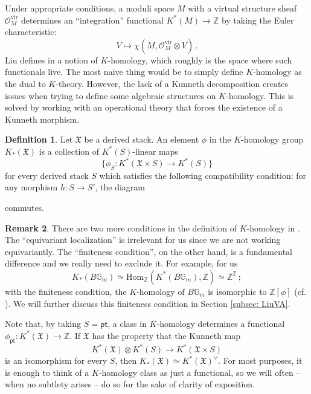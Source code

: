 \documentclass[12pt]{amsart}
\theoremstyle{definition}
\newtheorem{definition}{Definition}[section]
\newtheorem{remark}[definition]{Remark}
\newcommand{\BG}{{\mathbb{G}}}
\newcommand{\BZ}{{\mathbb{Z}}}
\newcommand{\CO}{{\mathcal O}}
\newcommand{\1}{\mathbf 1}
\newcommand{\FX}{{\mathfrak{X}}}
\DeclareMathOperator{\id}{id}
\newcommand{\pt}{{\mathsf{pt}}}
\newcommand{\Hom}{\mathrm{Hom}}
\newcommand{\vir}{\mathrm{vir}}
\begin{document}
Under appropriate conditions, a moduli space $M$ with a virtual structure sheaf $\CO_M^\vir$ determines an ``integration'' functional $K^\ast(M)\to \BZ$ by taking the Euler characteristic:
\[V\mapsto \chi(M, \CO^\vir_M\otimes V)\,.\]
Liu defines in \cite{Liu} a notion of $K$-homology, which roughly is the space where such functionals live. The most naive thing would be to simply define $K$-homology as the dual to $K$-theory. However, the lack of a Kunneth decomposition creates issues when trying to define some algebraic structures on $K$-homology. This is solved by working with an operational theory that forces the existence of a Kunneth morphism.

\begin{definition}\label{def: K-hom}
Let $\FX$ be a derived stack. An element $\phi$ in the $K$-homology group $K_\ast(\FX)$ is a collection of $K^\ast(S)$-linear maps
\[\{\phi_S\colon K^\ast(\FX\times S)\to K^\ast(S)\}\]
for every derived stack $S$ which satisfies the following compatibility condition: for any morphism $h\colon S\to S'$, the diagram 
\begin{center}
\end{center}
commutes.
\end{definition}

\begin{remark}
    There are two more conditions in the definition of $K$-homology in \cite{Liu}. The ``equivariant localization'' is irrelevant for us since we are not working equivariantly. The  ``finiteness condition'', on the other hand, is a fundamental difference and we really need to exclude it. For example, for us
    \[K_\ast(B\BG_m)\simeq \Hom_\BZ(K^\ast(B\BG_m), \BZ)\simeq \BZ^\BZ\,;\]
    with the finiteness condition, the $K$-homology of $B\BG_m$ is isomorphic to $\BZ[\phi]$ (cf. \cite[Proposition 2.3.5]{Liu}).
    We will further discuss this finiteness condition in Section \ref{subsec: LiuVA}.
\end{remark}

Note that, by taking $S=\pt$, a class in $K$-homology determines a functional $\phi_\pt\colon K^\ast(\FX)\to \BZ$. If $\FX$ has the property that the Kunneth map
\[K^\ast(\FX)\otimes K^\ast(S)\to K^\ast(\FX\times S)\]
is an isomorphism for every $S$, then $K_\ast(\FX)\simeq K^\ast(\FX)^\vee$. For most purposes, it is enough to think of a $K$-homology class as just a functional, so we will often -- when no subtlety arises -- do so for the sake of clarity of exposition.
\end{document}
